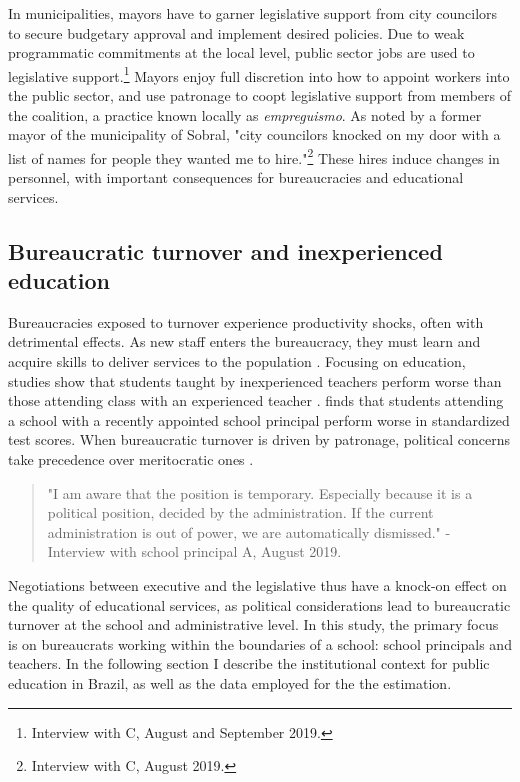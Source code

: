 \documentclass[12pt,a4paper]{article}
\begin{document}
In municipalities, mayors have to garner legislative support from city councilors to secure budgetary approval and implement desired policies. Due to weak programmatic commitments at the local level, public sector jobs are used to legislative support.\footnote{Interview with C, August and September 2019.} Mayors enjoy full discretion into how to appoint workers into the public sector, and use patronage to coopt legislative support from members of the coalition, a practice known locally as \textit{empreguismo}. As noted by a former mayor of the municipality of Sobral, "city councilors knocked on my door with a list of names for people they wanted me to hire."\footnote{Interview with C, August 2019.} These hires induce changes in personnel, with important consequences for bureaucracies and educational services.

\subsection*{Bureaucratic turnover and inexperienced education}

Bureaucracies exposed to turnover experience productivity shocks, often with detrimental effects. As new staff enters the bureaucracy, they must learn and acquire skills to deliver services to the population \citet{gailmard_slackers_2007}. Focusing on education, studies show that students taught by inexperienced teachers perform worse than those attending class with an experienced teacher \citet{clotfelter_teacher_2007}. \citet{akhtari_political_2015} finds that students attending a school with a recently appointed school principal perform worse in standardized test scores. When bureaucratic turnover is driven by patronage, political concerns take precedence over meritocratic ones \citet{colonnelli_patronage_2017}.

\begin{quote}
"I am aware that the position is temporary. Especially because it is a political position, decided by the administration. If the current administration is out of power, we are automatically dismissed." - Interview with school principal A, August 2019.
\end{quote}

Negotiations between executive and the legislative thus have a knock-on effect on the quality of educational services, as political considerations lead to bureaucratic turnover at the school and administrative level. In this study, the primary focus is on bureaucrats working within the boundaries of a school: school principals and teachers. In the following section I describe the institutional context for public education in Brazil, as well as the data employed for the the estimation.
\end{document}
